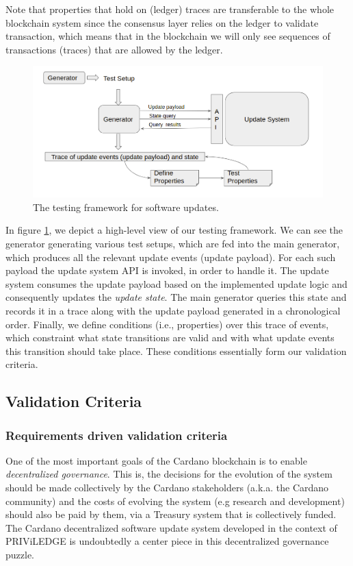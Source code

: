 Note that properties that hold on (ledger) traces are transferable to the whole
blockchain system since the consensus layer relies on the ledger to validate
transaction, which means that in the blockchain we will only see sequences of
transactions (traces) that are allowed by the ledger.

\begin{figure}[h!] %
	\centering
	\includegraphics[width=0.8\columnwidth,
	keepaspectratio]{figures/testing_framework.png}
	\caption{The testing framework for software updates.}
	\label{fig:testing_framework}
\end{figure}

In figure \ref{fig:testing_framework}, we depict a high-level view of our
testing framework. We can see the generator generating various test setups,
which are fed into the main generator, which produces all the relevant update
events (update payload). For each such payload the update system API is
invoked, in order to handle it. The update system consumes the update payload
based on the implemented update logic and consequently updates the
\emph{update
	state}. The main generator
queries this state and records it in a trace along
with the update payload generated in a chronological order. Finally, we define
conditions (i.e., properties) over this trace of events, which constraint what
state transitions are valid and with what update events this transition should
take place. These conditions essentially form our validation criteria.


\subsection{Validation Criteria}\label{validatioin_criteria}
\subsubsection{Requirements driven validation criteria}
One of the most important goals of the Cardano blockchain is to enable
\emph{decentralized governance}. This is, the decisions
for the evolution of the system should be made collectively by the Cardano
stakeholders (a.k.a. the Cardano community) and the costs of evolving the
system (e.g research and development)
should also be paid
by them, via a Treasury system that is collectively funded. The Cardano
decentralized
software update system developed in
the context of PRIViLEDGE is undoubtedly a center piece in this decentralized
governance puzzle.

